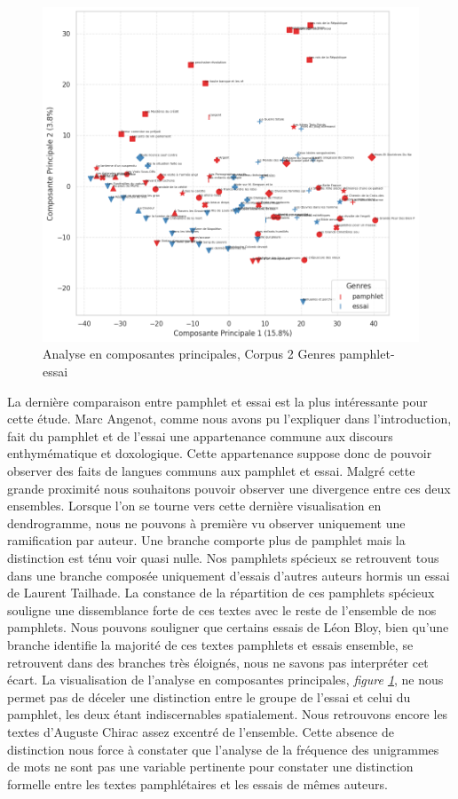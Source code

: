 \begin{figure}[H]
\centering %
\includegraphics[width=1\textwidth]{img/ACP-corpus-2-PamEssai.png}
\caption{Analyse en composantes principales, Corpus 2 Genres pamphlet-essai}
\label{'fig:ACP-corpus-2-PamEssai'}
\end{figure}

La dernière comparaison entre pamphlet et essai est la plus intéressante pour cette étude. Marc Angenot, comme nous avons pu l'expliquer dans l'introduction, fait du pamphlet et de l'essai une appartenance commune aux discours enthymématique et doxologique. Cette appartenance suppose donc de pouvoir observer des faits de langues communs aux pamphlet et essai. Malgré cette grande proximité nous souhaitons pouvoir observer une divergence entre ces deux ensembles. Lorsque l'on se tourne vers cette dernière visualisation en dendrogramme, nous ne pouvons à première vu observer uniquement une ramification par auteur. Une branche comporte plus de pamphlet mais la distinction est ténu voir quasi nulle. Nos pamphlets spécieux se retrouvent tous dans une branche composée uniquement d'essais d'autres auteurs hormis un essai de Laurent Tailhade. La constance de la répartition de ces pamphlets spécieux souligne une dissemblance forte de ces textes avec le reste de l'ensemble de nos pamphlets. Nous pouvons souligner que certains essais de Léon Bloy, bien qu'une branche identifie la majorité de ces textes pamphlets et essais ensemble, se retrouvent dans des branches très éloignés, nous ne savons pas interpréter cet écart.
La visualisation de l'analyse en composantes principales, \textit{figure \ref{'fig:ACP-corpus-2-PamEssai'}}, ne nous permet pas de déceler une distinction entre le groupe de l'essai et celui du pamphlet, les deux étant indiscernables spatialement. Nous retrouvons encore les textes d'Auguste Chirac assez excentré de l'ensemble. Cette absence de distinction nous force à constater que l'analyse de la fréquence des unigrammes de mots ne sont pas une variable pertinente pour constater une distinction formelle entre les textes pamphlétaires et les essais de mêmes auteurs.

